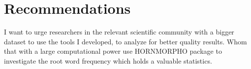 \section{Recommendations}

I want to urge researchers in the relevant scientific community with a bigger dataset to use the tools I developed, to analyze for better quality results. Whom that with a large computational power use HORNMORPHO\cite{HornMorpho} package to investigate the root word frequency which holds a valuable statistics.
